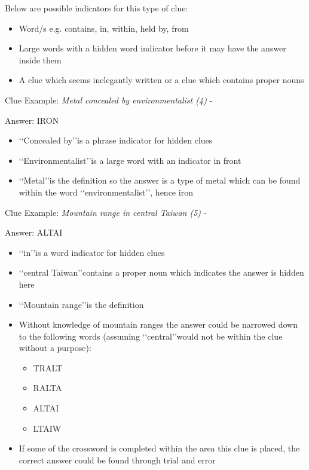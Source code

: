 Below are possible indicators for this type of clue:
\begin{itemize} 
	\item Word/s e.g. contains, in, within, held by, from 
	\item Large words with a hidden word indicator before it may have the answer inside them 
	\item A clue which seems inelegantly written or a clue which contains proper nouns  
\\
\end{itemize}

Clue Example: \emph{Metal concealed by environmentalist (4)} - \citep{shuchiHidden08}

Answer: IRON 

\begin{itemize}
	\item \lq\lq Concealed by\rq\rq is a phrase indicator for hidden clues 
	\item \lq\lq Environmentalist\rq\rq is a large word with an indicator in front 
	\item \lq\lq Metal\rq\rq is the definition so the answer is a type of metal which can be found within the word \lq\lq environmentalist\rq\rq, hence iron 
\\
\end{itemize}

Clue Example: \emph{Mountain range in central Taiwan (5)} - \citep{shuchiHidden08}

Answer: ALTAI 

\begin{itemize}
	\item \lq\lq in\rq\rq is a word indicator for hidden clues 
	\item \lq\lq central Taiwan\rq\rq contains a proper noun which indicates the answer is hidden here 
 	\item \lq\lq Mountain range\rq\rq is the definition 
 	\item Without knowledge of mountain ranges the answer could be narrowed down to the following words (assuming \lq\lq central\rq\rq would not be within the clue without a purpose): 
	\begin{itemize}
		\item TRALT 
		\item RALTA 
		\item ALTAI 
		\item LTAIW
	\end{itemize} 
\item If some of the crossword is completed within the area this clue is placed, the correct answer could be found through trial and error 
\end{itemize}

